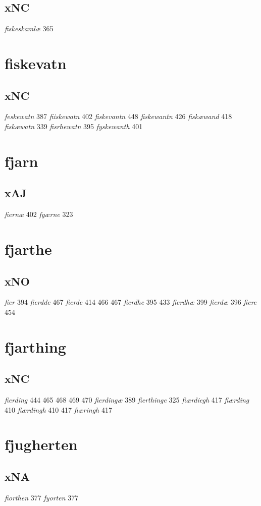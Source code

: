 \documentclass[a4paper,twocolumn]{article}
\begin{document}
\subsection{xNC}
\label{sec:org85ec7ce}
\emph{fiskeskamlæ} 365 
\section{fiskevatn}
\label{sec:org76575e1}
\subsection{xNC}
\label{sec:orgb3e0927}
\emph{feskewatn} 387 \emph{fiiskewatn} 402 \emph{fiskevantn} 448 \emph{fiskewantn} 426 \emph{fiskæwand} 418 \emph{fiskæwatn} 339 \emph{fisrhewatn} 395 \emph{fyskewanth} 401 
\section{fjarn}
\label{sec:orgf837ab2}
\subsection{xAJ}
\label{sec:org534f458}
\emph{fiernæ} 402 \emph{fyærne} 323 
\section{fjarthe}
\label{sec:orgc9cc454}
\subsection{xNO}
\label{sec:orga6dc2ce}
\emph{fier} 394 \emph{fierdde} 467 \emph{fierde} 414 466 467 \emph{fierdhe} 395 433 \emph{fierdhæ} 399 \emph{fierdæ} 396 \emph{fiere} 454 
\section{fjarthing}
\label{sec:orgc793969}
\subsection{xNC}
\label{sec:org2a7abd4}
\emph{fierding} 444 465 468 469 470 \emph{fierdingæ} 389 \emph{fierthinge} 325 \emph{fiærdiegh} 417 \emph{fiærding} 410 \emph{fiærdingh} 410 417 \emph{fiæringh} 417 
\section{fjugherten}
\label{sec:org4180e1c}
\subsection{xNA}
\label{sec:orgd497ae3}
\emph{fiorthen} 377 \emph{fyorten} 377 
\end{document}
